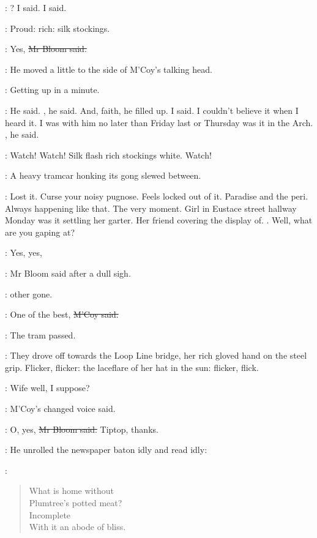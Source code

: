 \mccoy:
? I said.
 I said.

\BloomInt:
Proud:
rich:
silk stockings.

\Bloom:
Yes,
\sout{Mr Bloom said.}

:
He moved a little to the side of M'Coy's talking head.

\BloomInt:
Getting up in a minute.

\mccoy:
 He said.
, he said.
And, faith, he filled up.
 I said.
I couldn't believe it when I heard it.
I was with him no later than Friday last
or Thursday was it
in the Arch.
, he said.

\BloomInt:
Watch!
Watch!
Silk flash rich stockings white.
Watch!

:
A heavy tramcar honking its gong
slewed between.

\BloomInt:
Lost it.
Curse your noisy pugnose.
Feels locked out of it.
Paradise and the peri.
Always happening like that.
The very moment.
Girl in Eustace street hallway
Monday was it
settling her garter.
Her friend covering the display of.
.
Well, what are you gaping at?

\Bloom:
Yes, yes,

:
Mr Bloom said after a dull sigh.

\Bloom:
other gone.

\mccoy:
One of the best,
\sout{M'Coy said.}

:
The tram passed.

:
They drove off towards the Loop Line bridge,
her rich gloved hand on the steel grip.
Flicker, flicker:
the laceflare of her hat in the sun:
flicker, flick.

\mccoy:
Wife well, I suppose?

:
M'Coy's changed voice said.

\Bloom:
O, yes,
\sout{Mr Bloom said.}
Tiptop, thanks.

:
He unrolled the newspaper baton idly and read idly:

\BloomInt:
\begin{verse}
    What is home without \\
    Plumtree's potted meat? \\
    Incomplete \\
    With it an abode of bliss.
\end{verse}

